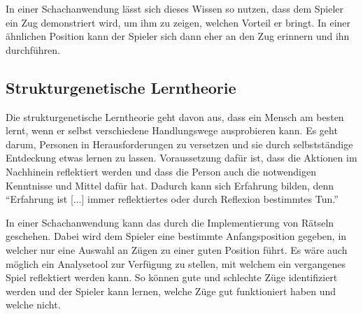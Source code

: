 In einer Schachanwendung lässt sich dieses Wissen so nutzen, dass dem Spieler ein Zug demonstriert wird, um ihm zu zeigen, welchen Vorteil er bringt.
In einer ähnlichen Position kann der Spieler sich dann eher an den Zug erinnern und ihn durchführen.

\subsection{Strukturgenetische Lerntheorie}
Die strukturgenetische Lerntheorie geht davon aus, dass ein Mensch am besten lernt, wenn er selbst verschiedene Handlungswege ausprobieren kann. Es geht darum, Personen in Herausforderungen zu versetzen und sie durch selbstständige Entdeckung etwas lernen zu lassen. Voraussetzung dafür ist, dass die Aktionen im Nachhinein reflektiert werden und dass die Person auch die notwendigen Kenntnisse und Mittel dafür hat. Dadurch kann sich Erfahrung bilden, denn \enquote{Erfahrung ist [...] immer reflektiertes oder durch Reflexion bestimmtes Tun.}\cite{kron_grundwissen_2024}

In einer Schachanwendung kann das durch die Implementierung von Rätseln geschehen. Dabei wird dem Spieler eine bestimmte Anfangsposition gegeben, in welcher nur eine Auswahl an Zügen zu einer guten Position führt. Es wäre auch möglich ein Analysetool zur Verfügung zu stellen, mit welchem ein vergangenes Spiel reflektiert werden kann. So können gute und schlechte Züge identifiziert werden und der Spieler kann lernen, welche Züge gut funktioniert haben und welche nicht.

